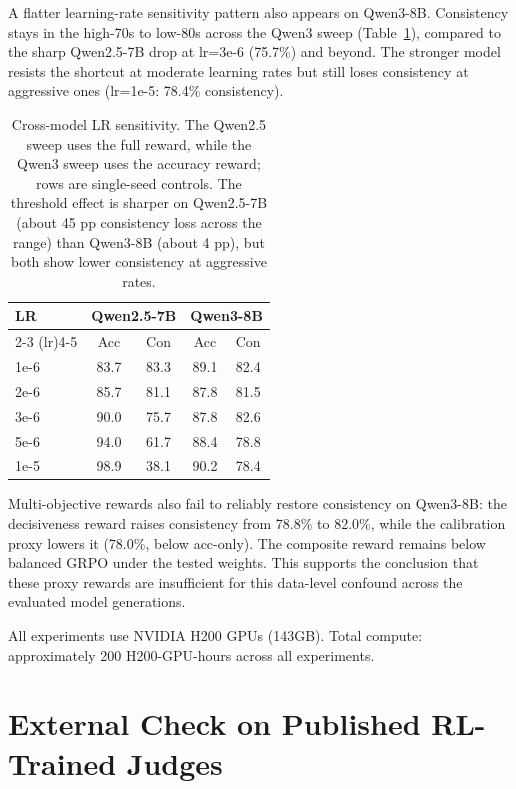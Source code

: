 \documentclass[letterpaper]{article}
\begin{document}
A flatter learning-rate sensitivity pattern also appears on Qwen3-8B. Consistency stays in the high-70s to low-80s across the Qwen3 sweep (Table~\ref{tab:crosslr}), compared to the sharp Qwen2.5-7B drop at lr=3e-6 (75.7\%) and beyond. The stronger model resists the shortcut at moderate learning rates but still loses consistency at aggressive ones (lr=1e-5: 78.4\% consistency).

\begin{table}[htbp]
\centering
\footnotesize
\begin{tabular}{lcccc}
\toprule
\textbf{LR} & \multicolumn{2}{c}{\textbf{Qwen2.5-7B}} & \multicolumn{2}{c}{\textbf{Qwen3-8B}} \\
\cmidrule(lr){2-3} \cmidrule(lr){4-5}
 & Acc & Con & Acc & Con \\
\midrule
1e-6 & 83.7 & 83.3 & 89.1 & 82.4 \\
2e-6 & 85.7 & 81.1 & 87.8 & 81.5 \\
3e-6 & 90.0 & 75.7 & 87.8 & 82.6 \\
5e-6 & 94.0 & 61.7 & 88.4 & 78.8 \\
1e-5 & 98.9 & 38.1 & 90.2 & 78.4 \\
\bottomrule
\end{tabular}
\caption{Cross-model LR sensitivity. The Qwen2.5 sweep uses the full reward, while the Qwen3 sweep uses the accuracy reward; rows are single-seed controls. The threshold effect is sharper on Qwen2.5-7B (about 45 pp consistency loss across the range) than Qwen3-8B (about 4 pp), but both show lower consistency at aggressive rates.}
\label{tab:crosslr}
\end{table}

Multi-objective rewards also fail to reliably restore consistency on Qwen3-8B: the decisiveness reward raises consistency from 78.8\% to 82.0\%, while the calibration proxy lowers it (78.0\%, below acc-only). The composite reward remains below balanced GRPO under the tested weights. This supports the conclusion that these proxy rewards are insufficient for this data-level confound across the evaluated model generations.

All experiments use NVIDIA H200 GPUs (143GB). Total compute: approximately 200 H200-GPU-hours across all experiments.

\section{External Check on Published RL-Trained Judges}
\label{app:judgelrm}
\end{document}
